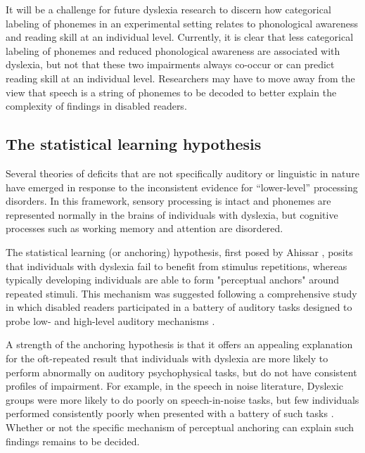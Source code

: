 \documentclass[../uwthesis.tex]{subfiles}
\begin{document}
It will be a challenge for future dyslexia research to discern how categorical labeling of phonemes in an experimental setting relates to phonological awareness and reading skill at an individual level. Currently, it is clear that less categorical labeling of phonemes and reduced phonological awareness are associated with dyslexia, but not that these two impairments always co-occur or can predict reading skill at an individual level. Researchers may have to move away from the view that speech is a string of phonemes to be decoded to better explain the complexity of findings in disabled readers.

\subsection{The statistical learning hypothesis}
Several theories of deficits that are not specifically auditory or linguistic in nature
have emerged in response to the inconsistent evidence for “lower-level” processing
disorders. In this framework, sensory processing is intact and phonemes are represented normally in the brains of individuals with dyslexia, but cognitive processes such as working memory and attention are disordered. 

The statistical learning (or anchoring) hypothesis, first posed by Ahissar \citep{Ahissar2006,Ahissar2007}, posits that individuals with dyslexia fail to benefit from stimulus repetitions, whereas typically developing individuals are able to form "perceptual anchors" around repeated stimuli. This mechanism was suggested following a comprehensive study in which disabled readers participated in a battery of auditory tasks designed to probe low- and high-level auditory mechanisms \citep{Ahissar2007}.

A strength of the anchoring hypothesis is that it offers an appealing explanation for
the oft-repeated result that individuals with dyslexia are more likely to perform abnormally on auditory psychophysical tasks, but do not have consistent profiles of impairment. For example, in the speech in noise literature, Dyslexic groups were more likely to do poorly on speech-in-noise tasks, but few individuals performed consistently poorly when presented with a battery of such tasks \citep{Calcus2016,Calcus2018}. Whether or not the specific mechanism of perceptual anchoring can explain such findings remains to be decided.
\end{document}
